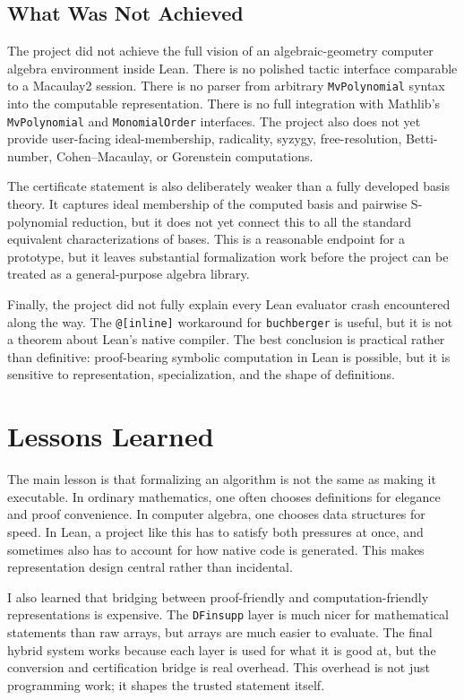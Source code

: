 \documentclass[acmsmall,nonacm,screen]{acmart}
\begin{document}
\subsection{What Was Not Achieved}

The project did not achieve the full vision of an algebraic-geometry computer algebra environment
inside Lean.
There is no polished tactic interface comparable to a Macaulay2 session.
There is no parser from arbitrary \texttt{MvPolynomial} syntax into the computable representation.
There is no full integration with Mathlib's \texttt{MvPolynomial} and \texttt{MonomialOrder}
interfaces.
The project also does not yet provide user-facing ideal-membership, radicality, syzygy,
free-resolution, Betti-number, Cohen--Macaulay, or Gorenstein computations.

The certificate statement is also deliberately weaker than a fully developed \Groebner{} basis
theory.
It captures ideal membership of the computed basis and pairwise S-polynomial reduction, but it does
not yet connect this to all the standard equivalent characterizations of \Groebner{} bases.
This is a reasonable endpoint for a prototype, but it leaves substantial formalization work before
the project can be treated as a general-purpose algebra library.

Finally, the project did not fully explain every Lean evaluator crash encountered along the way.
The \texttt{@[inline]} workaround for \texttt{buchberger} is useful, but it is not a theorem about
Lean's native compiler.
The best conclusion is practical rather than definitive: proof-bearing symbolic computation in
Lean is possible, but it is sensitive to representation, specialization, and the shape of
definitions.

\section{Lessons Learned}

The main lesson is that formalizing an algorithm is not the same as making it executable.
In ordinary mathematics, one often chooses definitions for elegance and proof convenience.
In computer algebra, one chooses data structures for speed.
In Lean, a project like this has to satisfy both pressures at once, and sometimes also has to
account for how native code is generated.
This makes representation design central rather than incidental.

I also learned that bridging between proof-friendly and computation-friendly representations is
expensive.
The \texttt{DFinsupp} layer is much nicer for mathematical statements than raw arrays, but arrays
are much easier to evaluate.
The final hybrid system works because each layer is used for what it is good at, but the conversion
and certification bridge is real overhead.
This overhead is not just programming work; it shapes the trusted statement itself.
\end{document}

